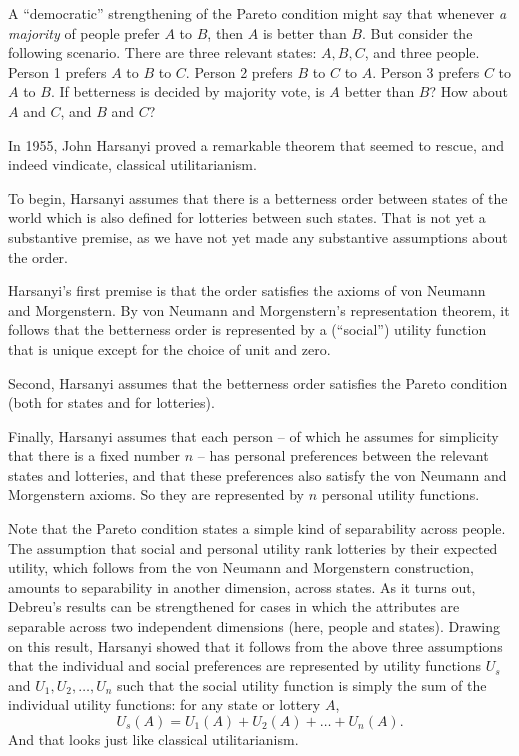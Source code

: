 \begin{exercise1}
  A ``democratic'' strengthening of the Pareto condition might say
  that whenever \emph{a majority} of people prefer $A$ to $B$, then
  $A$ is better than $B$. But consider the following scenario. There
  are three relevant states: $A,B,C$, and three people. Person 1
  prefers $A$ to $B$ to $C$. Person 2 prefers $B$ to $C$ to
  $A$. Person 3 prefers $C$ to $A$ to $B$. If betterness is decided by
  majority vote, is $A$ better than $B$? How about $A$ and $C$, and
  $B$ and $C$?
\end{exercise1}

In 1955, John Harsanyi proved a remarkable theorem that seemed to
rescue, and indeed vindicate, classical utilitarianism. 

To begin, Harsanyi assumes that there is a betterness order
between states of the world which is also defined for lotteries between
such states. That is not yet a substantive premise, as we have not yet
made any substantive assumptions about the order. 

Harsanyi's first premise is that the order satisfies the axioms of von
Neumann and Morgenstern. By von Neumann and Morgenstern's
representation theorem, it follows that the betterness order is
represented by a (``social'') utility function that is unique except
for the choice of unit and zero.

Second, Harsanyi assumes that the betterness order satisfies the
Pareto condition (both for states and for lotteries).

Finally, Harsanyi assumes that each person -- of which he assumes for
simplicity that there is a fixed number $n$ -- has personal
preferences between the relevant states and lotteries, and that these
preferences also satisfy the von Neumann and Morgenstern axioms. So
they are represented by $n$ personal utility functions.

Note that the Pareto condition states a simple kind of separability
across people. The assumption that social and personal utility rank
lotteries by their expected utility, which follows from the von
Neumann and Morgenstern construction, amounts to separability in
another dimension, across states. As it turns out, Debreu's results
can be strengthened for cases in which the attributes are separable
across two independent dimensions (here, people and states). Drawing
on this result, Harsanyi showed that it follows from the above three
assumptions that the individual and social preferences are represented
by utility functions $U_s$ and $U_1,U_2,\ldots,U_n$ such that the
social utility function is simply the sum of the individual utility
functions: for any state or lottery $A$,
\[
  U_s(A) = U_1(A) + U_2(A) + \ldots + U_n(A).
\]
And that looks just like classical utilitarianism.

